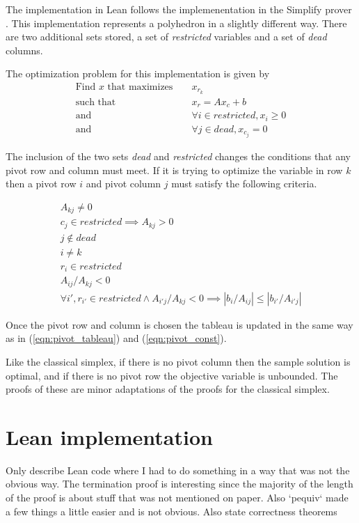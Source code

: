 \documentclass[11pt]{article} %
\begin{document}
The implementation in Lean follows the implemenentation in the Simplify prover \cite{simplify}. This implementation represents a polyhedron in a slightly different way. There are two additional sets stored, a set of \textit{restricted} variables and a set of \textit{dead} columns.

The optimization problem for this implementation is given by
\begin{equation}
  \begin{aligned}
  \text{Find } x \text{ that maximizes } && x_{r_k} \\
  \text{such that } && x_r = A x_c + b \\
  \text{and } && \forall i \in restricted, x_i \ge 0 \\
  \text{and } && \forall j \in dead, x_{c_j} = 0
  \end{aligned}
\end{equation}

The inclusion of the two sets \textit{dead} and \textit{restricted} changes the conditions that any pivot row and column must meet. If it is trying to optimize the variable in row $k$ then a pivot row $i$ and pivot column $j$ must satisfy the following criteria.

\begin{equation}
  \begin{aligned}
    A_{kj} \ne 0 \\
    c_j \in restricted \implies A_{kj} > 0 \\
    j \notin dead \\
    i \ne k \\
    r_i \in restricted \\
    A_{ij} / A_{kj} < 0 \\
    \forall i', r_{i'} \in restricted \wedge A_{i'j} / A_{kj} < 0 \implies \left|b_i/A_{ij}\right| \le \left|b_{i'} / A_{i'j}\right|
  \end{aligned}
\end{equation}

Once the pivot row and column is chosen the tableau is updated in the same way as in (\ref{eqn:pivot_tableau}) and (\ref{eqn:pivot_const}).

Like the classical simplex, if there is no pivot column then the sample solution is optimal, and if there is no pivot row the objective variable is unbounded. The proofs of these are minor adaptations of the proofs for the classical simplex.

\section{Lean implementation}
\color{red} Only describe Lean code where I had to do something in a way that was not the obvious way. The termination proof is interesting since the majority of the length of the proof is about stuff that was not mentioned on paper. Also `pequiv` made a few things a little easier and is not obvious. Also state correctness theorems \color{black}
\end{document}
